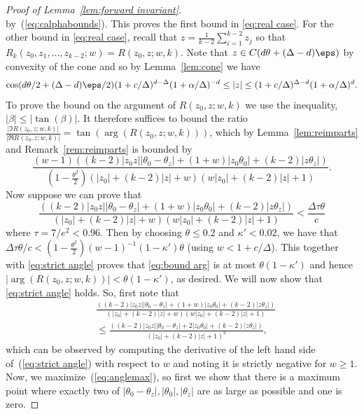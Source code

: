 \begin{proof}[Proof of Lemma~\ref{lem:forward invariant}]
\[\]
by~(\ref{eq:calphabounds}). This proves the first bound in \eqref{eq:real case}.
%
%
%
%
%
For the other bound in \eqref{eq:real case}, recall that
 $z=\frac{1}{k-2}\sum_{i=1}^{k-2}z_j$ so that
 $R_k(z_0,z_1,\ldots,z_{k-2};w)=R(z_0,z;w,k)$. 
%
Note that $z\in C(d\theta+(\Delta-d)\eps)$ by convexity of the cone and so by Lemma~\ref{lem:cone} we have
\[
\cos(d\theta/2+(\Delta-d)\eps/2)(1+c/\Delta)^{d-\Delta}(1+\alpha/\Delta)^{-d}\leq |z|\leq (1+c/\Delta)^{\Delta-d}(1+\alpha/\Delta)^{d}.
\]
To prove the bound on the argument of $R(z_0,z;w,k)$ we use the inequality, $|\beta|\leq |\tan(\beta)|$. It therefore suffices to bound the ratio $\frac{|\Im R(z_0,z;w,k)|}{|\Re R(z_0,z;w,k)|} = \tan(\arg(R(z_0,z;w,k)))$, which by Lemma~\ref{lem:reimparts} and Remark~\ref{rem:reimparts} is bounded by
 \begin{equation}\label{eq:bound arg}
  \frac{(w-1)\left((k-2)|z_0z||\theta_0-\theta_z|+(1+w)|z_0 \theta_0|+(k-2)|z\theta_z|\right)}
 {(1 - \frac{\theta^2}{2})(|z_0|+(k-2)|z|+w)(w|z_0|+(k-2)|z|+1)}.  
\end{equation}
Now suppose we can prove that
\begin{equation}\label{eq:strict angle}
  \frac{\left((k-2)|z_0z||\theta_0-\theta_z|+(1+w)|z_0 \theta_0|+(k-2)|z\theta_z|\right)}
 {(|z_0|+(k-2)|z|+w)(w|z_0|+(k-2)|z|+1)}
  < \frac{\Delta \tau \theta}{c} 
\end{equation}
where $\tau  = 7/e^2 < 0.96$.
%
Then by choosing $\theta \leq 0.2$ and $\kappa' < 0.02$, we have that $\Delta \tau \theta /c < (1 - \frac{\theta^2}{2})(w-1)^{-1}(1 - \kappa')\theta$ (using $w < 1 + c/\Delta$). This together with \eqref{eq:strict angle}  proves that \eqref{eq:bound arg} is at most $\theta(1-\kappa')$ and hence $|\arg(R(z_0,z;w,k))|< \theta(1-\kappa')$, as desired.
%
We will now show that \eqref{eq:strict angle} holds.
So, first note that
\begin{align}
 \nonumber & \frac{\left((k-2)|z_0z||\theta_0-\theta_z|+(1+w)|z_0 \theta_0|+(k-2)|z\theta_z|\right)}
 {(|z_0|+(k-2)|z|+w)(w|z_0|+(k-2)|z|+1)} \\
 & \leq \frac{\left((k-2)|z_0z||\theta_0-\theta_z|+2|z_0\theta_0|+(k-2)|z\theta_z|\right)}{(|z_0|+(k-2)|z|+1)^2}, \label{eq:anglemax}
\end{align}
which can be observed by computing the derivative of the left hand side of~(\ref{eq:strict angle}) with respect to $w$ and noting it is strictly negative for $w \geq 1$.
Now, we maximize~(\ref{eq:anglemax}), so first we show that there is a maximum point where exactly two of $|\theta_0-\theta_z|,|\theta_0|,|\theta_z|$ are as large as possible and one is zero.

\end{proof}
